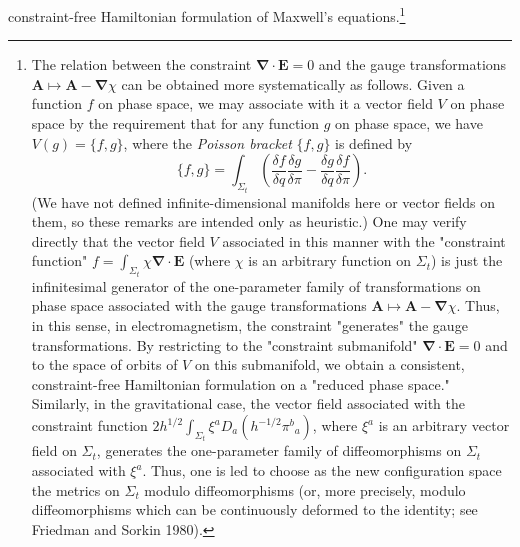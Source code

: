 constraint-free Hamiltonian formulation of Maxwell's equations.\footnote{The
relation between the constraint \(\boldsymbol{\nabla}\cdot\mathbf{E}=0\) and the gauge
transformations \(\mathbf{A}\mapsto\mathbf{A}-\boldsymbol{\nabla}\chi\) can be obtained more
systematically as follows. Given a function \(f\) on phase space, we may associate
with it a vector field \(V\) on phase space by the requirement that for any function
\(g\) on phase space, we have \(V(g)=\{f,g\}\), where the \emph{Poisson bracket}
\(\{f,g\}\) is defined by
\[
  \{f,g\}=\int_{\Sigma_t}\left(
    \frac{\delta f}{\delta q}\frac{\delta g}{\delta\pi}
    -\frac{\delta g}{\delta q}\frac{\delta f}{\delta\pi}\right).
\]
(We have not defined infinite-dimensional manifolds here or vector fields on them,
so these remarks are intended only as heuristic.) One may verify directly that the
vector field \(V\) associated in this manner with the "constraint function"
\(f=\int_{\Sigma_t}\chi\boldsymbol{\nabla}\cdot\mathbf{E}\) (where \(\chi\) is an arbitrary
function on \(\Sigma_t\)) is just the infinitesimal generator of the one-parameter
family of transformations on phase space associated with the gauge transformations
\(\mathbf{A}\mapsto\mathbf{A}-\boldsymbol{\nabla}\chi\). Thus, in this sense, in electromagnetism,
the constraint "generates" the gauge transformations. By restricting to the
"constraint submanifold" \(\boldsymbol{\nabla}\cdot\mathbf{E}=0\) and to the space of orbits of
\(V\) on this submanifold, we obtain a consistent, constraint-free Hamiltonian
formulation on a "reduced phase space." Similarly, in the gravitational case, the
vector field associated with the constraint function
\(2h^{1/2}\int_{\Sigma_t}\xi^aD_a(h^{-1/2}\pi^b{}_a)\), where \(\xi^a\) is an
arbitrary vector field on \(\Sigma_t\), generates the one-parameter family of
diffeomorphisms on \(\Sigma_t\) associated with \(\xi^a\). Thus, one is led to
choose as the new configuration space the metrics on \(\Sigma_t\) modulo
diffeomorphisms (or, more precisely, modulo diffeomorphisms which can be
continuously deformed to the identity; see Friedman and Sorkin 1980).}

